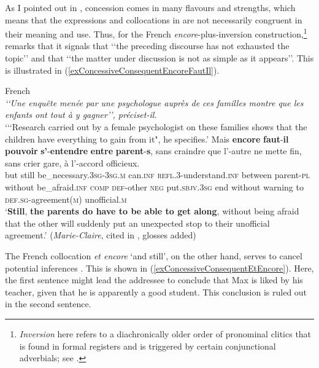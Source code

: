 \begin{sloppypar}
As I pointed out in , concession comes in many flavours and strengths, which means that the expressions and collocations in  are not necessarily congruent in their meaning and use. Thus, for the French \textit{encore}-plus-inversion construction,\footnote{\textit{Inversion} here refers to a diachronically older order of pronominal clitics that is found in formal registers and is triggered by certain conjunctional adverbials; see \textcite[336–337]{MosegaardHansen2016}.} \textcite[196]{MosegaardHansen2008} remarks that it signals that \lq\lq the preceding discourse has not exhausted the topic\rq\rq{ }and that \lq\lq{}the matter under discussion is not as simple as it appears\rq\rq{}. This is illustrated in (\ref{exConcessiveConsequentEncoreFautIl}).
\end{sloppypar}
 
\begin{exe}
	\ex French\label{exConcessiveConsequentEncoreFautIl}\\
	\textit{\lq\lq Une enquête menée par une psychologue auprès de ces familles montre que les enfants ont tout à y gagner\rq\rq, préciset-il.}\\
	\lq {\lq\lq}Research carried out by a female psychologist on these families shows that the children have everything to gain from it", he specifies.\rq
	\exi{} \gll Mais \textbf{encore} \textbf{faut}-\textbf{il} \textbf{pouvoir} \textbf{s'}-\textbf{entendre} \textbf{entre} \textbf{parent}-\textbf{s}, sans craindre que l'-autre ne mette fin, {sans crier gare}, à l'-accord officieux.\\
but still be\_necessary.3\textsc{sg}-3\textsc{sg}.\textsc{m} can.\textsc{inf} \textsc{refl}.3-understand.\textsc{inf} between parent-\textsc{pl} without be\_afraid.\textsc{inf} \textsc{comp} \textsc{def}-other \textsc{neg} put.\textsc{sbjv}.3\textsc{sg} end {without warning} to \textsc{def}.\textsc{sg}-agreement(\textsc{m}) unofficial.\textsc{m}\\
	\glt \lq \textbf{Still}, \textbf{the parents do have to be able to get along}, without being afraid that the other will suddenly put an unexpected stop to their unofficial agreement.' (\textit{Marie-Claire}, cited in \cite[193–194]{MosegaardHansen2008}, glosses added)
\end{exe}

The French collocation \textit{et encore} \lq and still\rq{}, on the other hand, serves to cancel potential inferences \parencite[195]{MosegaardHansen2008}. This is shown in (\ref{exConcessiveConsequentEtEncore}). Here, the first sentence might lead the addressee to conclude that Max is liked by his teacher, given that he is apparently a good student. This conclusion is ruled out in the second sentence.

